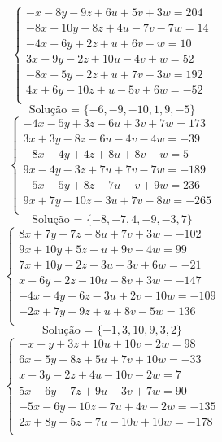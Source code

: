 \documentclass[12pt,oneside,a4paper]{article}
\begin{document}
\vspace{\baselineskip}
\begin{equation*}
\begin{cases}
-x-8y-9z+6u+5v+3w=204 \\
-8x+10y-8z+4u-7v-7w=14 \\
-4x+6y+2z+u+6v-w=10 \\
3x-9y-2z+10u-4v+w=52 \\
-8x-5y-2z+u+7v-3w=192 \\
4x+6y-10z+u-5v+6w=-52 \\
\end{cases}
\end{equation*}
\begin{equation*}
\text{Solução = }\{-6,-9,-10,1,9,-5\}
\end{equation*}
\vspace{\baselineskip}
\begin{equation*}
\begin{cases}
-4x-5y+3z-6u+3v+7w=173 \\
3x+3y-8z-6u-4v-4w=-39 \\
-8x-4y+4z+8u+8v-w=5 \\
9x-4y-3z+7u+7v-7w=-189 \\
-5x-5y+8z-7u-v+9w=236 \\
9x+7y-10z+3u+7v-8w=-265 \\
\end{cases}
\end{equation*}
\begin{equation*}
\text{Solução = }\{-8,-7,4,-9,-3,7\}
\end{equation*}
\vspace{\baselineskip}
\begin{equation*}
\begin{cases}
8x+7y-7z-8u+7v+3w=-102 \\
9x+10y+5z+u+9v-4w=99 \\
7x+10y-2z-3u-3v+6w=-21 \\
x-6y-2z-10u-8v+3w=-147 \\
-4x-4y-6z-3u+2v-10w=-109 \\
-2x+7y+9z+u+8v-5w=136 \\
\end{cases}
\end{equation*}
\begin{equation*}
\text{Solução = }\{-1,3,10,9,3,2\}
\end{equation*}
\vspace{\baselineskip}
\begin{equation*}
\begin{cases}
-x-y+3z+10u+10v-2w=98 \\
6x-5y+8z+5u+7v+10w=-33 \\
x-3y-2z+4u-10v-2w=7 \\
5x-6y-7z+9u-3v+7w=90 \\
-5x-6y+10z-7u+4v-2w=-135 \\
2x+8y+5z-7u-10v+10w=-178 \\
\end{cases}
\end{equation*}
\end{document}
